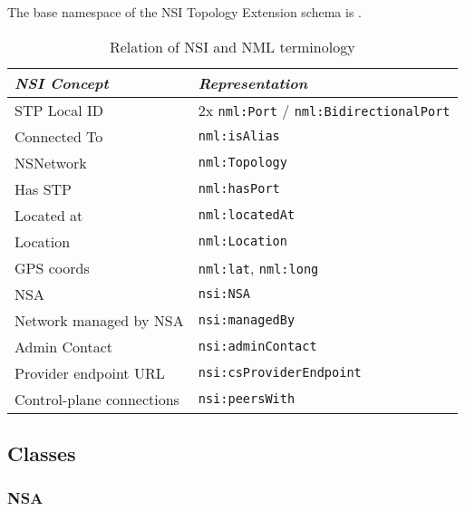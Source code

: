 \documentclass[12pt]{article}  %
\begin{document}
The base namespace of the NSI Topology Extension schema is .

\begin{table}
\begin{center}

  \begin{tabular}{|l|l|}
\hline
     \textit{NSI Concept} &                               \textit{Representation}\\
\hline
             STP Local ID & 2x \texttt{nml:Port} / \texttt{nml:BidirectionalPort}\\
\hline
             Connected To &                                  \texttt{nml:isAlias}\\
\hline
                NSNetwork &                                 \texttt{nml:Topology}\\
\hline
                  Has STP &                                  \texttt{nml:hasPort}\\
\hline
               Located at &                                \texttt{nml:locatedAt}\\
\hline
                 Location &                                 \texttt{nml:Location}\\
\hline
               GPS coords &                   \texttt{nml:lat}, \texttt{nml:long}\\
\hline
                      NSA &                                      \texttt{nsi:NSA}\\
\hline
   Network managed by NSA &                                \texttt{nsi:managedBy}\\
\hline
            Admin Contact &                             \texttt{nsi:adminContact}\\
\hline
    Provider endpoint URL &                       \texttt{nsi:csProviderEndpoint}\\
\hline
Control-plane connections &                                \texttt{nsi:peersWith}\\
\hline
\end{tabular}
\caption{Relation of NSI and NML terminology}\label{tab:nsi-nml}
  \end{center}
\end{table}

\subsection{Classes}%
\label{sub:classes}

\subsubsection{NSA}%
\label{class:nsa}
\end{document}
